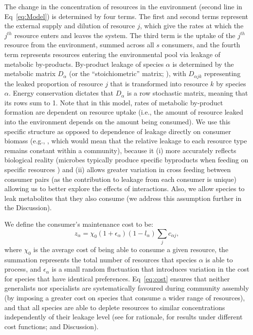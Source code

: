 \documentclass[10pt,letterpaper]{article}
\begin{document}
The change in the concentration of resources in the environment (second line in Eq~\ref{eq:Model}) is determined by four terms. The first and second terms represent the external supply and dilution of resource $j$, which give the rates at which the $j^{th}$ resource enters and leaves the system. The third term is the uptake of the $j^{th}$ resource from the environment, summed across all $s$ consumers, and the fourth term represents resources entering the environmental pool via leakage of metabolic by-products. By-product leakage of species $\alpha$ is determined by the metabolic matrix $D_{\alpha}$ (or the ``stoichiometric'' matrix; \cite{Marsland2019}), with $D_{\alpha jk}$ representing the leaked proportion of resource $ j $ that is transformed into resource $ k $ by species $\alpha$. Energy conservation dictates that $D_{\alpha}$ is a row stochastic matrix, meaning that its rows sum to 1. Note that in this model, rates of metabolic by-product formation are dependent on resource uptake (i.e., the amount of resource leaked into the environment depends on the amount being consumed). We use this specific structure as opposed to dependence of leakage directly on consumer biomass (e.g., \cite{Butler2018}, which would mean that the relative leakage to each resource type remains constant within a community), because it (i) more accurately reflects biological reality (microbes typically produce specific byproducts when feeding on specific resources \cite{Goldford2018}) and (ii) allows greater variation in cross feeding between consumer pairs (as the contribution to leakage from each consumer is unique) allowing us to better explore the effects of interactions. Also, we allow species to leak metabolites that they also consume (we address this assumption further in the Discussion).

We define the consumer's maintenance cost to be:
\begin{equation}\label{eq:cost}
    z_\alpha  = \chi_0 (1 + \epsilon_{\alpha})(1-l_{\alpha})\sum_j c_{\alpha j},
\end{equation}
where $\chi_0$ is the average cost of being able to consume a given resource, the summation represents the total number of resources that species $\alpha$ is able to process, and $\epsilon_{\alpha}$ is a small random fluctuation that introduces variation in the cost for species that have identical preferences. Eq~\ref{eq:cost} ensures that neither generalists nor specialists are systematically favoured during community assembly (by imposing a greater cost on species that consume a wider range of resources), and that all species are able to deplete resources to similar concentrations independently of their leakage level (see  for rationale,  for results under different cost functions; and Discussion).
\end{document}
